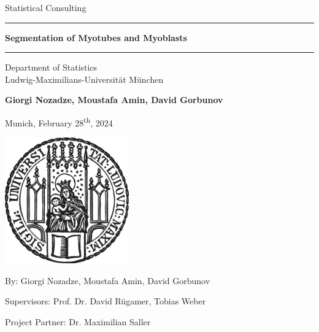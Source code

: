 \documentclass[12pt]{article}
\newcommand{\mytitle}{Segmentation of Myotubes and Myoblasts}
\newcommand{\myname}{Giorgi Nozadze, Moustafa Amin, David Gorbunov}
\newcommand{\mysupervisor}{Prof. Dr. David Rügamer, Tobias Weber}
\newcommand{\mypartner}{Dr. Maximilian Saller}
\numberwithin{equation}{section}
\numberwithin{figure}{section}
\begin{document}
	
	
	\begin{titlepage}
		\begin{center}
			
			\LARGE
			Statistical Consulting
			
			\vspace{0.5cm}
			
			\rule{\textwidth}{1.5pt}
			\LARGE
			\textbf{\mytitle}
			\rule{\textwidth}{1.5pt}
			
			\vspace{0.5cm}
			
			\large
			Department of Statistics \\
			Ludwig-Maximilians-Universität München 
			
			\vfill
			
			\Large
			\textbf{\myname}
			
			\vfill
			
			\large
			Munich, February 28\textsuperscript{th}, 2024
			
			\vfill
			
			\includegraphics[width = 0.4\textwidth]{sigillum.png}
			
			\vfill
			
			\normalsize
			By: \myname			
		
			Supervisors: \mysupervisor
						
			Project Partner: \mypartner

			\vfill

			
			
		\end{center}
	\end{titlepage}
 	
 	\listoffigures
 	\clearpage
	\tableofcontents
	\newpage
	\setcounter{page}{1}
	\newpage
	
	\newpage
	
	\newpage
	
	\newpage
	
	\newpage
	
	\newpage
	
	\newpage
	
	\newpage
	\printbibliography
	\appendix
	\cleardoublepage
	
\end{document}
